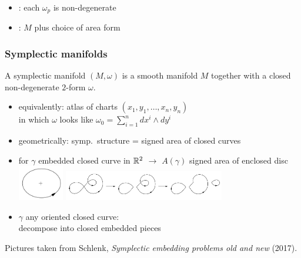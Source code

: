 \begin{frame}
\begin{columns}
\begin{column}{0.21\textwidth}
    \end{column}
  \end{columns}
  \begin{itemize}
    \item {}: each $\omega_p$ is non-degenerate
    \item {}: $M$ plus choice of area form
  \end{itemize}
\end{frame}

\begin{frame}
  \frametitle{Symplectic manifolds}
  \begin{definition}
    A symplectic manifold $(M,\omega)$ is a smooth manifold $M$ together with a closed non-degenerate $2$-form $\omega$.
  \end{definition}
  \begin{itemize}
    \item equivalently: atlas of charts $(x_1,y_1,\dots,x_n,y_n)$\\
    in which $\omega$ looks like $\omega_0=\sum_{i=1}^n dx^i\wedge dy^i$
    \item geometrically: symp.\ structure = signed area of closed curves
    \item for $\gamma$ embedded closed curve in $\mathbb{R}^2$ $\to$ $A(\gamma)$ signed area of enclosed disc
    \includegraphics[width=2cm]{images/curve_orientation1.png}\pause
    \includegraphics[width=7cm]{images/splitting_nonembedded_curve.png}
    \item $\gamma$ any oriented closed  curve:\\ decompose into closed embedded pieces
  \end{itemize}
  \tiny{Pictures taken from Schlenk, \emph{Symplectic embedding problems old and new} (2017).}
\end{frame}

